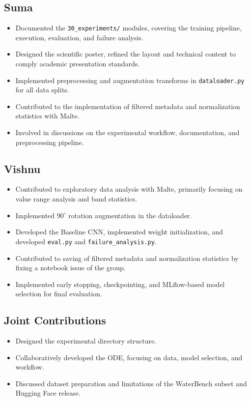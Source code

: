 \documentclass[sigconf]{acmart}
\begin{document}
\subsection*{Suma}
\begin{itemize}
    \item Documented the \texttt{30\_experiments/} modules, covering the training pipeline, execution, evaluation, and failure analysis.
    \item Designed the scientific poster, refined the layout and technical content to comply academic presentation standards.
    \item Implemented preprocessing and augmentation transforms in \texttt{dataloader.py} for all data splits.
    \item Contributed to the implementation of filtered metadata and normalization statistics with Malte.
    \item Involved in discussions on the experimental workflow, documentation, and preprocessing pipeline.
\end{itemize}
\subsection*{Vishnu}
\begin{itemize}
    \item Contributed to exploratory data analysis with Malte, primarily focusing on value range analysis and band statistics.
    \item Implemented $90^\circ$ rotation augmentation in the dataloader.
    \item Developed the Baseline CNN, implemented weight initialization, and developed \texttt{eval.py} and \texttt{failure\_analysis.py}.
    \item Contributed to saving of filtered metadata and normalization statistics by fixing a notebook issue of the group.
    \item Implemented early stopping, checkpointing, and MLflow-based model selection for final evaluation.
\end{itemize}
\subsection*{Joint Contributions}
\begin{itemize}
    \item Designed the experimental directory structure.
    \item Collaboratively developed the ODE, focusing on data, model selection, and workflow.
    \item Discussed dataset preparation and limitations of the WaterBench subset and Hugging Face release.
\end{itemize}
\end{document}
